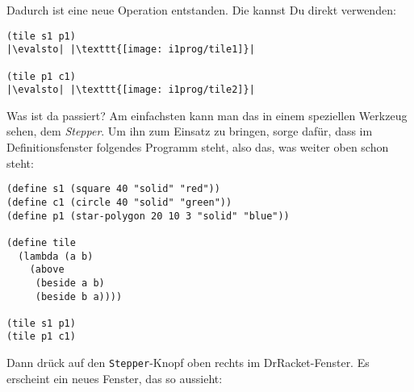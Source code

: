 Dadurch ist eine neue Operation entstanden.  Die kannst Du direkt
verwenden:
%
\begin{lstlisting}
(tile s1 p1)
|\evalsto| |\texttt{[image: i1prog/tile1]}|

(tile p1 c1)
|\evalsto| |\texttt{[image: i1prog/tile2]}|
\end{lstlisting}
%
Was ist da passiert?  Am einfachsten kann man das in einem speziellen
Werkzeug sehen, dem \textit{Stepper}.  Um ihn zum
Einsatz zu bringen, sorge dafür, dass im Definitionsfenster folgendes
Programm steht, also das, was weiter oben schon steht:
%
\begin{lstlisting}
(define s1 (square 40 "solid" "red"))
(define c1 (circle 40 "solid" "green"))
(define p1 (star-polygon 20 10 3 "solid" "blue"))

(define tile
  (lambda (a b)
    (above
     (beside a b)
     (beside b a))))

(tile s1 p1)
(tile p1 c1)
\end{lstlisting}
%
Dann drück auf den \texttt{Stepper}-Knopf oben rechts im
DrRacket-Fenster.  Es erscheint ein neues Fenster, das so aussieht:

